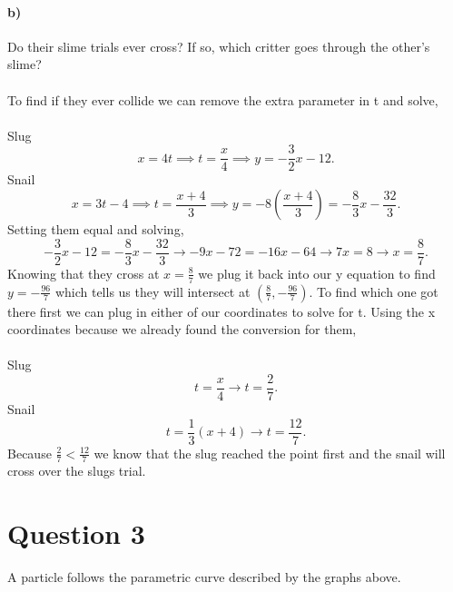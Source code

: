 \documentclass{report}
\begin{document}
\paragraph{b)} Do their slime trials ever cross? If so, which critter goes through the other's slime? \\ \\
To find if they ever collide we can remove the extra parameter in t and solve, \\ \\
Slug
\[
x=4t \implies t= \frac{ x }{ 4 } \implies y=-\frac{ 3 }{ 2 } x-12
.\] 
Snail
\[
x=3t-4 \implies t= \frac{ x+4 }{ 3 } \implies y=-8\left( \frac{ x+4 }{ 3 }  \right) =-\frac{ 8 }{ 3 } x-\frac{ 32 }{ 3 }
.\] 
Setting them equal and solving,
\[
-\frac{ 3 }{ 2 } x-12 = -\frac{ 8 }{ 3 } x-\frac{ 32 }{ 3 } \to -9x -72 =-16x-64 \to 7x=8 \to x=\frac{ 8 }{ 7 } 
.\] 
Knowing that they cross at $ x=\frac{ 8 }{ 7 }  $ we plug it back into our y equation to find $ y=-\frac{ 96 }{ 7 }  $ which tells us they will intersect at $ \left( \frac{ 8 }{ 7 } ,-\frac{ 96 }{ 7 }  \right)  $. To find which one got there first we can plug in either of our coordinates to solve for t. Using the x coordinates because we already found the conversion for them, \\ \\
Slug
\[
t=\frac{ x }{ 4 } \to t=\frac{ 2 }{ 7 } 
.\] 
Snail
\[
t=\frac{ 1 }{ 3 } \left( x+4 \right) \to t=\frac{ 12 }{ 7 } 
.\] 
Because $ \frac{ 2 }{ 7 } < \frac{ 12 }{ 7 }  $ we know that the slug reached the point first and the snail will cross over the slugs trial. 
\section*{Question 3}%
\label{sec:Question 3}
A particle follows the parametric curve described by the graphs above. 
\end{document}
